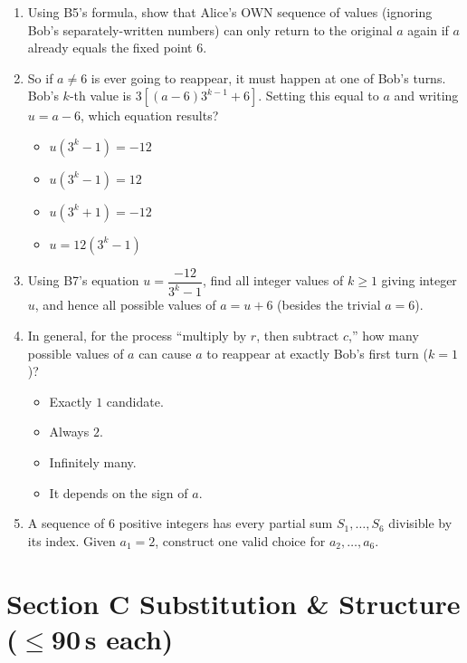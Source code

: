 \documentclass[11pt,a4paper]{article}
\begin{document}
\begin{enumerate}
\item Using B5's formula, show that Alice's OWN sequence of values (ignoring Bob's separately-written numbers) can only return to the original $a$ again if $a$ already equals the fixed point $6$.

\item So if $a\neq6$ is ever going to reappear, it must happen at one of Bob's turns. Bob's $k$-th value is $3\left[(a-6)3^{k-1}+6\right]$. Setting this equal to $a$ and writing $u=a-6$, which equation results?
\begin{itemize}
\item[A)] $u(3^k-1)=-12$
\item[B)] $u(3^k-1)=12$
\item[C)] $u(3^k+1)=-12$
\item[D)] $u=12(3^k-1)$
\end{itemize}

\item Using B7's equation $u=\dfrac{-12}{3^k-1}$, find all integer values of $k\geq1$ giving integer $u$, and hence all possible values of $a=u+6$ (besides the trivial $a=6$).

\item In general, for the process ``multiply by $r$, then subtract $c$,'' how many possible values of $a$ can cause $a$ to reappear at exactly Bob's first turn ($k=1$)?
\begin{itemize}
\item[A)] Exactly $1$ candidate.
\item[B)] Always $2$.
\item[C)] Infinitely many.
\item[D)] It depends on the sign of $a$.
\end{itemize}

\item A sequence of $6$ positive integers has every partial sum $S_1,\ldots,S_6$ divisible by its index. Given $a_1=2$, construct one valid choice for $a_2,\ldots,a_6$.

\end{enumerate}

\section*{Section C \quad Substitution \& Structure \hfill{\normalfont\small($\leq$90\,s each)}}
\end{document}
